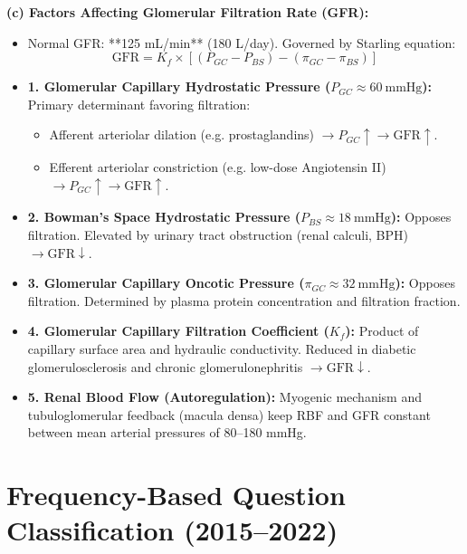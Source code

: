 \documentclass[11pt,a4paper]{article}
\begin{document}
\begin{ansbox}
\textbf{(c) Factors Affecting Glomerular Filtration Rate (GFR):}
\begin{itemize}[leftmargin=*]
    \item Normal GFR: **125 mL/min** (180 L/day). Governed by Starling equation:
    $$\text{GFR} = K_f \times [(P_{GC} - P_{BS}) - (\pi_{GC} - \pi_{BS})]$$
    \item \textbf{1. Glomerular Capillary Hydrostatic Pressure ($P_{GC} \approx 60\ \text{mmHg}$):} Primary determinant favoring filtration:
    \begin{itemize}
        \item Afferent arteriolar dilation (e.g. prostaglandins) $\rightarrow P_{GC} \uparrow \rightarrow \text{GFR} \uparrow$.
        \item Efferent arteriolar constriction (e.g. low-dose Angiotensin II) $\rightarrow P_{GC} \uparrow \rightarrow \text{GFR} \uparrow$.
    \end{itemize}
    \item \textbf{2. Bowman's Space Hydrostatic Pressure ($P_{BS} \approx 18\ \text{mmHg}$):} Opposes filtration. Elevated by urinary tract obstruction (renal calculi, BPH) $\rightarrow \text{GFR} \downarrow$.
    \item \textbf{3. Glomerular Capillary Oncotic Pressure ($\pi_{GC} \approx 32\ \text{mmHg}$):} Opposes filtration. Determined by plasma protein concentration and filtration fraction.
    \item \textbf{4. Glomerular Capillary Filtration Coefficient ($K_f$):} Product of capillary surface area and hydraulic conductivity. Reduced in diabetic glomerulosclerosis and chronic glomerulonephritis $\rightarrow \text{GFR} \downarrow$.
    \item \textbf{5. Renal Blood Flow (Autoregulation):} Myogenic mechanism and tubuloglomerular feedback (macula densa) keep RBF and GFR constant between mean arterial pressures of 80--180 mmHg.
\end{itemize}
\end{ansbox}

\newpage
\section{Frequency-Based Question Classification (2015--2022)}
\end{document}

